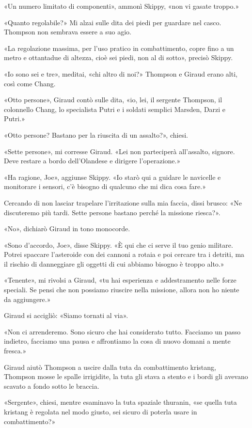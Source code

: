 «Un numero limitato di componenti», ammonì Skippy, «non vi gasate
troppo.»

«Quanto regolabile?» Mi alzai sulle dita dei piedi per guardare nel
casco. Thompson non sembrava essere a suo agio.

«La regolazione massima, per l'uso pratico in combattimento, copre fino
a un metro e ottantadue di altezza, cioè sei piedi, non al di sotto»,
precisò Skippy.

«Io sono sei e tre», meditai, «chi altro di noi?» Thompson e Giraud
erano alti, così come Chang.

«Otto persone», Giraud contò sulle dita, «io, lei, il sergente Thompson,
il colonnello Chang, lo specialista Putri e i soldati semplici Marsden,
Darzi e Putri.»

«Otto persone? Bastano per la riuscita di un assalto?», chiesi.

«Sette persone», mi corresse Giraud. «Lei non parteciperà all'assalto,
signore. Deve restare a bordo dell'Olandese e dirigere l'operazione.»

«Ha ragione, Joe», aggiunse Skippy. «Io starò qui a guidare le navicelle
e monitorare i sensori, c'è bisogno di qualcuno che mi dica cosa fare.»

Cercando di non lasciar trapelare l'irritazione sulla mia faccia, dissi
brusco: «Ne discuteremo più tardi. Sette persone bastano perché la
missione riesca?».

«No», dichiarò Giraud in tono monocorde.

«Sono d'accordo, Joe», disse Skippy. «È qui che ci serve il tuo genio
militare. Potrei spaccare l'asteroide con dei cannoni a rotaia e poi
cercare tra i detriti, ma il rischio di danneggiare gli oggetti di cui
abbiamo bisogno è troppo alto.»

«Tenente», mi rivolsi a Giraud, «tu hai esperienza e addestramento nelle
forze speciali. Se pensi che non possiamo riuscire nella missione,
allora non ho niente da aggiungere.»

Giraud si accigliò: «Siamo tornati al via».

«Non ci arrenderemo. Sono sicuro che hai considerato tutto. Facciamo un
passo indietro, facciamo una pausa e affrontiamo la cosa di nuovo domani
a mente fresca.»

Giraud aiutò Thompson a uscire dalla tuta da combattimento kristang,
Thompson mosse le spalle irrigidite, la tuta gli stava a stento e i
bordi gli avevano scavato a fondo sotto le braccia.

«Sergente», chiesi, mentre esaminavo la tuta spaziale thuranin, «se
quella tuta kristang è regolata nel modo giusto, sei sicuro di poterla
usare in combattimento?»

